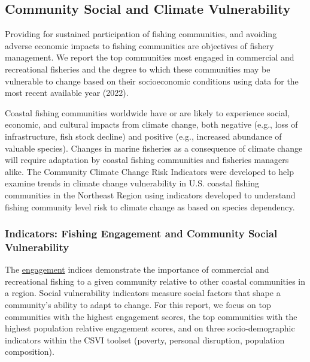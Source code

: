 \documentclass[
  10pt,
]{article}
\begin{document}
\hypertarget{community-social-and-climate-vulnerability}{%
\subsection{Community Social and Climate Vulnerability}\label{community-social-and-climate-vulnerability}}

Providing for sustained participation of fishing communities, and avoiding adverse economic impacts to fishing communities are objectives of fishery management. We report the top communities most engaged in commercial and recreational fisheries and the degree to which these communities may be vulnerable to change based on their socioeconomic conditions using data for the most recent available year (2022).

Coastal fishing communities worldwide have or are likely to experience social, economic, and cultural impacts from climate change, both negative (e.g., loss of infrastructure, fish stock decline) and positive (e.g., increased abundance of valuable species). Changes in marine fisheries as a consequence of climate change will require adaptation by coastal fishing communities and fisheries managers alike. The Community Climate Change Risk Indicators were developed to help examine trends in climate change vulnerability in U.S. coastal fishing communities in the Northeast Region using indicators developed to understand fishing community level risk to climate change as based on species dependency.

\hypertarget{indicators-fishing-engagement-and-community-social-vulnerability}{%
\subsubsection{Indicators: Fishing Engagement and Community Social Vulnerability}\label{indicators-fishing-engagement-and-community-social-vulnerability}}

The \href{https://noaa-edab.github.io/catalog/engagement.html}{engagement} indices demonstrate the importance of commercial and recreational fishing to a given community relative to other coastal communities in a region. Social vulnerability indicators measure social factors that shape a community's ability to adapt to change. For this report, we focus on top communities with the highest engagement scores, the top communities with the highest population relative engagement scores, and on three socio-demographic indicators within the CSVI toolset (poverty, personal disruption, population composition).
\end{document}
